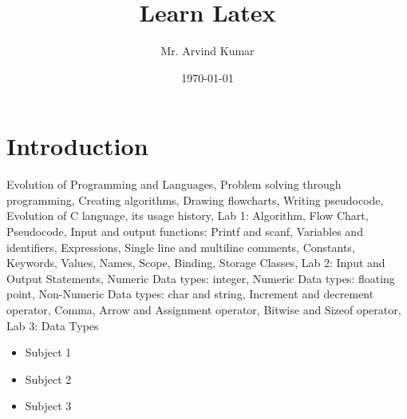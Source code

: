 \documentclass{book}
\begin{document}
	\title{Learn Latex}
	\author{Mr. Arvind Kumar}
	\date{\today}
	\maketitle
	\tableofcontents
	\newpage
	\chapter{Introduction} Evolution of Programming and Languages, Problem solving through programming, Creating algorithms, Drawing flowcharts, Writing pseudocode, Evolution of C language, its usage history, Lab 1: Algorithm, Flow Chart, Pseudocode, Input and output functions: Printf and scanf, Variables and identifiers, Expressions, Single line and multiline comments, Constants, Keywords, Values, Names, Scope, Binding, Storage Classes, Lab 2: Input and Output Statements, Numeric Data types: integer, Numeric Data types: floating point, Non-Numeric Data types: char and string, Increment and decrement operator, Comma, Arrow and Assignment operator, Bitwise and Sizeof operator, Lab 3: Data Types
				
		\begin{itemize}
			\item Subject 1
			\item Subject 2
			\item Subject 3
		\end{itemize}
	
\end{document}
